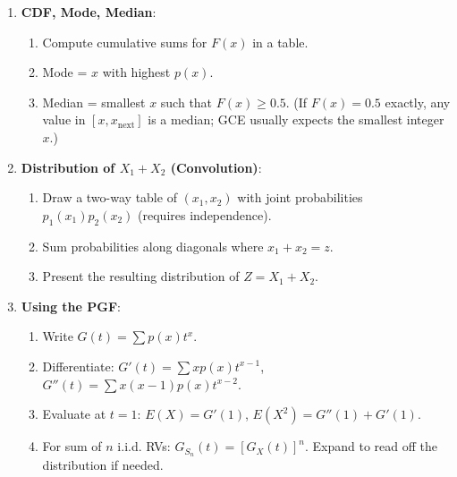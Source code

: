 \documentclass[11pt]{article}
\begin{document}
\begin{methode}
\begin{enumerate}
\begin{enumerate}
          \end{enumerate}
    \item \textbf{CDF, Mode, Median}:
          \begin{enumerate}
              \item Compute cumulative sums for $F(x)$ in a table.
              \item Mode = $x$ with highest $p(x)$.
              \item Median = smallest $x$ such that $F(x) \ge 0.5$. (If $F(x)=0.5$ exactly, any value in $[x, x_{\text{next}}]$ is a median; GCE usually expects the smallest integer $x$.)
          \end{enumerate}
    \item \textbf{Distribution of $X_1+X_2$ (Convolution)}:
          \begin{enumerate}
              \item Draw a two-way table of $(x_1, x_2)$ with joint probabilities $p_1(x_1)p_2(x_2)$ (requires independence).
              \item Sum probabilities along diagonals where $x_1+x_2 = z$.
              \item Present the resulting distribution of $Z = X_1+X_2$.
          \end{enumerate}
    \item \textbf{Using the PGF}:
          \begin{enumerate}
              \item Write $G(t) = \sum p(x)t^x$.
              \item Differentiate: $G'(t) = \sum x p(x) t^{x-1}$, $G''(t) = \sum x(x-1) p(x) t^{x-2}$.
              \item Evaluate at $t=1$: $E(X)=G'(1)$, $E(X^2)=G''(1)+G'(1)$.
              \item For sum of $n$ i.i.d. RVs: $G_{S_n}(t) = [G_X(t)]^n$. Expand to read off the distribution if needed.
          \end{enumerate}
\end{enumerate}
\end{methode}
\end{document}
